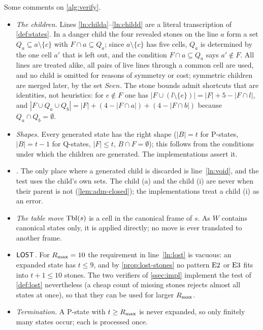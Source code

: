 Some comments on \cref{alg:verify}.

\begin{itemize}[leftmargin=1.6em]
\item \emph{The children.} Lines \ref{ln:childa}--\ref{ln:childd} are a literal transcription of
  \cref{def:states}. In a danger child the
  four revealed stones on the line $a$ form a set $Q_a\subseteq a\setminus\{c\}$ with $F\cap a\subseteq Q_a$;
  since $a\setminus\{c\}$ has five cells, $Q_a$ is determined by the one cell $a'$ that is left out, and the
  condition $F\cap a\subseteq Q_a$ says $a'\notin F$. All lines are treated alike, all pairs of live lines
  through a common cell are used, and no child is omitted for reasons of symmetry or cost; symmetric
  children are merged later, by the set $\mathit{Seen}$. The stone bounds admit shortcuts that are
  identities, not heuristics: for $e\notin F$ one has $|F\cup(l\setminus\{e\})|=|F|+5-|F\cap l|$, and
  $|F\cup Q_a\cup Q_b|=|F|+(4-|F\cap a|)+(4-|F\cap b|)$ because $Q_a\cap Q_b=\emptyset$.
\item \emph{Shapes.} Every generated state has the right shape ($|B|=t$ for P-states, $|B|=t-1$ for
  Q-states, $|F|\le t$, $B\cap F=\emptyset$); this follows from the conditions under which the children are
  generated. The implementations assert it.
\item \emph{\VOID.} The only place where a generated child is discarded is line~\ref{ln:void}, and the
  test uses the child's own sets. The child (a) and the child (i) are never \VOID{} when their
  parent is not (\cref{lem:adm-closed}); the implementations treat a \VOID{} child (i) as an error.
\item \emph{The table move} $\mathrm{Tbl}(s)$ is a cell in the canonical frame of $s$. As $W$ contains canonical
  states only, it is applied directly; no move is ever translated to another frame.
\item \emph{$\mathsf{LOST}$.} For $R_{\max}=10$ the requirement in line~\ref{ln:lost} is vacuous: an expanded state has
  $t\le 9$, and by \cref{prop:lost-stones} no pattern $\mathrm{E2}$ or $\mathrm{E3}$ fits into $t+1\le 10$ stones. The two
  verifiers of \cref{ssec:impl} implement the test of \cref{def:lost} nevertheless (a cheap count of
  missing stones rejects almost all states at once), so that they can be used for larger $R_{\max}$.
\item \emph{Termination.} A P-state with $t\ge R_{\max}$ is never expanded, so only finitely many states
  occur; each is processed once.
\end{itemize}

